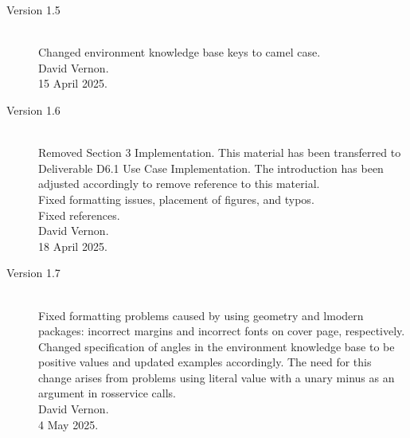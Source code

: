 \documentclass{CSSRforAfrica}
\begin{document}
\begin{description}
\item [Version 1.5]~\\
Changed environment knowledge base keys to camel case.\\
David Vernon.\\
15 April 2025.   

\newpage
\item [Version 1.6]~\\
Removed Section 3 Implementation. This material has been transferred to Deliverable D6.1 Use Case Implementation. The introduction has been adjusted accordingly to remove reference to this material.\\
Fixed formatting issues, placement of figures, and typos. \\
Fixed references.\\
David Vernon.\\
18 April 2025.  

\item [Version 1.7]~\\
Fixed formatting problems caused by using geometry and lmodern packages: incorrect margins and incorrect fonts on cover page, respectively. \\
Changed specification of angles in the environment knowledge base to be positive values and updated examples accordingly. The need for this change arises from problems using  literal value with a unary minus as an argument in rosservice calls. \\
David Vernon.\\
4 May 2025.  



\end{description}
\end{document}
